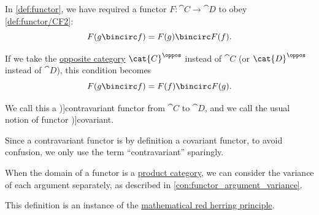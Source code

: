 \begin{definition}\label{def:contravariant_functor}
  In \cref{def:functor}, we have required a functor \( F: \cat{C} \to \cat{D} \) to obey \ref{def:functor/CF2}:
  \begin{equation*}
    F(g \bincirc f) = F(g) \bincirc F(f).
  \end{equation*}

  \begin{thmenum}
     If we take the \hyperref[def:opposite_category]{opposite category} \( \cat{C}^\oppos \) instead of \( \cat{C} \) (or \( \cat{D}^\oppos \) instead of \( \cat{D} \)), this condition becomes
    \begin{equation*}
      F(g \bincirc f) = F(f) \bincirc F(g).
    \end{equation*}
  \end{thmenum}

  We call this a \term[ru=контравариантный функтор (\cite[def. III.1.1]{ЦаленкоШульгейфер1974ОсновыТеорииКатегорий})]{contravariant functor} from \( \cat{C} \) to \( \cat{D} \), and we call the usual notion of functor \term[ru=ковариантный (функтор) (\cite[def. III.1.1]{ЦаленкоШульгейфер1974ОсновыТеорииКатегорий})]{covariant}.
\end{definition}
\begin{comments}
  \item Since a contravariant functor is by definition a covariant functor, to avoid confusion, we only use the term \enquote{contravariant} sparingly.

  \item When the domain of a functor is a \hyperref[def:product_category]{product category}, we can consider the variance of each argument separately, as described in \cref{con:functor_argument_variance}.

  \item This definition is an instance of the \hyperref[rem:red_herring_principle]{mathematical red herring principle}.
\end{comments}

